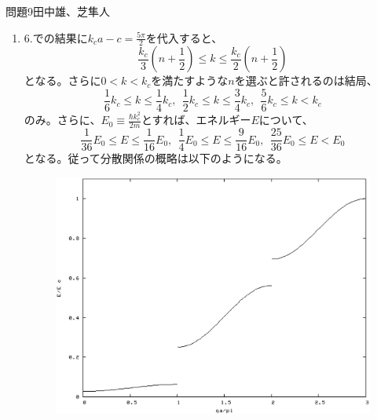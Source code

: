 \documentclass[fleqn]{jbook}
\begin{document}
\begin{answer}{問題9}{田中雄、芝隼人}
\begin{enumerate}
\item
6.での結果に$k_{c}a-c=\frac{5\pi}{2}$を代入すると、
\begin{equation}
\frac{k_{c}}{3}(n+\frac{1}{2}) \le k \le \frac{k_{c}}{2}(n+\frac{1}{2})
\end{equation}
となる。さらに$0<k<k_{c}$を満たすような$n$を選ぶと許されるのは結局、
\begin{equation}
\frac{1}{6}k_{c} \le k \le \frac{1}{4}k_{c}, \ \ 
\frac{1}{2}k_{c} \le k \le \frac{3}{4}k_{c}, \ \
\frac{5}{6}k_{c} \le k < k_{c}
\end{equation}
のみ。さらに、$E_{0}\equiv \frac{\hbar k_{c}^{2}}{2m}$とすれば、エネルギー$E$について、
\begin{equation}
\frac{1}{36}E_{0} \le E \le \frac{1}{16}E_{0}, \ \ 
\frac{1}{4}E_{0} \le E \le \frac{9}{16}E_{0}, \ \
\frac{25}{36}E_{0} \le E < E_{0}
\end{equation}
となる。従って分散関係の概略は以下のようになる。

\begin{figure}[htbp]
  \begin{center}
    \includegraphics[width=110mm]{2003phy9-5.eps}
  \end{center}
\end{figure}

\end{enumerate}
\end{answer}
\end{document}
